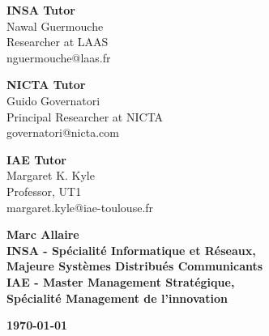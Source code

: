 \documentclass[10pt]{report}
\begin{document}
\begin{titlepage}
\vspace{1.3cm}
\begin{center}
\begin{minipage}{.3\textwidth}
\begin{center}
\textbf{INSA Tutor}\\
Nawal Guermouche\\
Researcher at LAAS\\
nguermouche@laas.fr
\end{center}
\end{minipage}
\begin{minipage}{.3\textwidth}
\begin{center}
\textbf{NICTA Tutor}\\
Guido Governatori\\
Principal Researcher at NICTA\\
governatori@nicta.com
\end{center}
\end{minipage}
\begin{minipage}{.3\textwidth}
\begin{center}
\textbf{IAE Tutor}\\
Margaret K. Kyle\\
Professor, UT1\\
margaret.kyle@iae-toulouse.fr
\end{center}
\end{minipage}
\end{center}

\vfill
\begin{minipage}{0.55\textwidth}
\begin{flushleft}
\textbf{\large Marc Allaire\\[.5cm] 
\small INSA - Spécialité Informatique et Réseaux,\\\hspace{.5cm}Majeure Systèmes Distribués Communicants\\
IAE - Master Management Stratégique,\\\hspace{.5cm}Spécialité Management de l'innovation}
\end{flushleft}
\end{minipage}
\begin{minipage}{0.4\textwidth}
\begin{flushright}
\textbf{\today}
\end{flushright}
\end{minipage}
\end{titlepage}
\newpage
{} %
\end{document}

